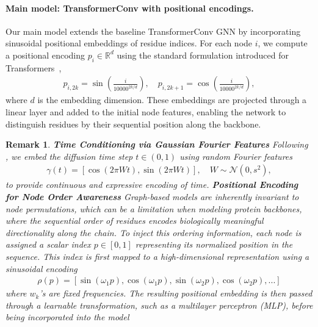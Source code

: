 \documentclass[a4paper,12pt]{article}
\newtheorem{remark}{Remark}[section]
\begin{document}
\paragraph{Main model: TransformerConv with positional encodings.}
Our main model extends the baseline TransformerConv GNN by incorporating sinusoidal positional embeddings of residue indices. 
For each node \(i\), we compute a positional encoding \(p_i \in \mathbb{R}^d\) using the standard formulation introduced for Transformers~\cite{vaswaniAttentionAllYou2017}, 
\begin{align*}
    p_{i,2k} = \sin\!\left(\frac{i}{10000^{2k/d}}\right), \quad p_{i,2k+1} = \cos\!\left(\frac{i}{10000^{2k/d}}\right),
\end{align*}
where \(d\) is the embedding dimension. These embeddings are projected through a linear layer and added to the initial node features, enabling the network to distinguish residues by their sequential position along the backbone.

\begin{remark} %
    \textbf{Time Conditioning via Gaussian Fourier Features}
    Following \cite{song2021ScoreBasedGenerativeModeling}, we embed the diffusion time step \(t\in\left(0,1\right)\) using random Fourier features \cite{tancikFourierFeaturesLet2020}
    \begin{align*}
        \gamma\left(t\right)=\left[\cos\left(2\pi Wt\right),\sin\left(2\pi Wt\right)\right],\quad W\sim\mathcal{N}\left(0,s^2\right),
    \end{align*}
    to provide continuous and expressive encoding of time.
    \textbf{Positional Encoding for Node Order Awareness}
    Graph-based models are inherently invariant to node permutations, which can be a limitation when modeling protein backbones, where the sequential order of residues encodes biologically meaningful directionality along the chain. To inject this ordering information, each node is assigned a scalar index \(p\in\left[0,1\right]\) representing its normalized position in the sequence. This index is first mapped to a high-dimensional representation using a sinusoidal encoding \cite{vaswaniAttentionAllYou2017}
    \begin{align*}
        \rho\left(p\right)=\left[\sin\left(\omega_1 p\right),\cos\left(\omega_1 p\right),\sin\left(\omega_2 p\right),\cos\left(\omega_2 p\right),...\right]
    \end{align*}
    where \(w_k\)'s are fixed frequencies. The resulting positional embedding is then passed through a learnable transformation, such as a multilayer perceptron (MLP), before being incorporated into the model
\end{remark}
\end{document}
